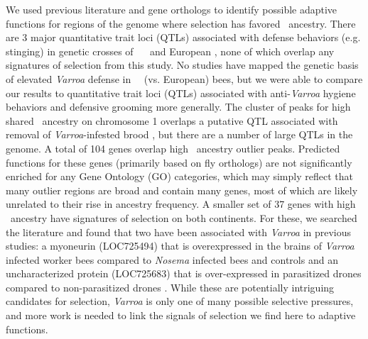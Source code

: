 We used previous literature and gene orthologs to identify possible adaptive functions for regions of the genome where selection has favored \scutellata\ ancestry. There are 3 major quantitative trait loci (QTLs) associated with defense behaviors (e.g. stinging) in genetic crosses of  \africanized\ \hyb\  and  European  \cite{Hunt:1998th, Hunt:2007im}, none of which overlap any signatures of selection from this study. No studies have mapped the genetic basis of elevated \textit{Varroa} defense in \africanized\ \hyb\ (vs. European) bees, but we were able to compare our results to quantitative trait loci (QTLs) associated with anti-\textit{Varroa} hygiene behaviors \cite{Tsuruda:2012fa, Oxley:2010dw, Spotter:2012dx} and defensive grooming \cite{ArechavaletaVelasco:2012cm} more generally. The cluster of peaks for high shared \A\ ancestry on chromosome 1 overlaps a putative QTL associated with removal of \textit{Varroa}-infested brood \cite{Spotter:2012dx}, but there are a number of large QTLs in the genome. A total of 104 genes overlap high \A\ ancestry outlier peaks. Predicted functions for these genes (primarily based on fly orthologs) are not significantly enriched for any Gene Ontology (GO) categories, which may simply reflect that many outlier regions are broad and contain many genes, most of which are likely unrelated to their rise in ancestry frequency. A smaller set of 37 genes with high \A\ ancestry have signatures of selection on both continents. For these, we searched the literature and found that two have been associated with \textit{Varroa} in previous studies: a myoneurin (LOC725494) that is overexpressed in the brains of \textit{Varroa} infected worker bees compared to \textit{Nosema} infected bees and controls \cite{McDonnell:2013ej} and an uncharacterized protein (LOC725683) that is over-expressed in parasitized drones compared to non-parasitized drones \cite{Surlis:2018cb}. While these are potentially intriguing candidates for selection, \textit{Varroa} is only one of many possible selective pressures, and more work is needed to link the signals of selection we find here to adaptive functions.

